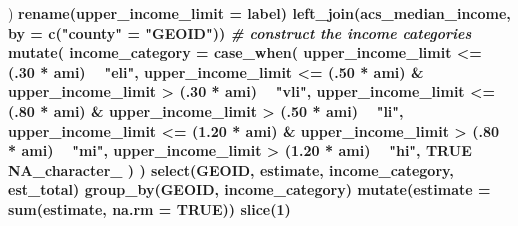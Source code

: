 \documentclass[
]{article}
\newenvironment{Shaded}{\begin{snugshade}}{\end{snugshade}}
\newcommand{\CommentTok}[1]{\textcolor[rgb]{0.56,0.35,0.01}{\textit{#1}}}
\newcommand{\DataTypeTok}[1]{\textcolor[rgb]{0.13,0.29,0.53}{#1}}
\newcommand{\DecValTok}[1]{\textcolor[rgb]{0.00,0.00,0.81}{#1}}
\newcommand{\FloatTok}[1]{\textcolor[rgb]{0.00,0.00,0.81}{#1}}
\newcommand{\KeywordTok}[1]{\textcolor[rgb]{0.13,0.29,0.53}{\textbf{#1}}}
\newcommand{\NormalTok}[1]{#1}
\newcommand{\OperatorTok}[1]{\textcolor[rgb]{0.81,0.36,0.00}{\textbf{#1}}}
\newcommand{\OtherTok}[1]{\textcolor[rgb]{0.56,0.35,0.01}{#1}}
\newcommand{\StringTok}[1]{\textcolor[rgb]{0.31,0.60,0.02}{#1}}
\begin{document}
\begin{Shaded}
\begin{Highlighting}[]
{{{{{{{{{{{{{{{{{{{{{{{{{{\NormalTok{  ) }\OperatorTok{%>%}
\StringTok{  }\KeywordTok{rename}\NormalTok{(}\DataTypeTok{upper_income_limit =}\NormalTok{ label) }\OperatorTok{%>%}
\StringTok{  }\KeywordTok{left_join}\NormalTok{(acs_median_income, }\DataTypeTok{by =} \KeywordTok{c}\NormalTok{(}\StringTok{"county"}\NormalTok{ =}\StringTok{ "GEOID"}\NormalTok{)) }\OperatorTok{%>%}
\StringTok{  }\CommentTok{# construct the income categories}
\StringTok{  }\KeywordTok{mutate}\NormalTok{(}
    \DataTypeTok{income_category =}
      \KeywordTok{case_when}\NormalTok{(}
\NormalTok{        upper_income_limit }\OperatorTok{<=}\StringTok{ }\NormalTok{(.}\DecValTok{30} \OperatorTok{*}\StringTok{ }\NormalTok{ami)       }\OperatorTok{~}\StringTok{ "eli"}\NormalTok{,}
\NormalTok{        upper_income_limit }\OperatorTok{<=}\StringTok{ }\NormalTok{(.}\DecValTok{50} \OperatorTok{*}\StringTok{ }\NormalTok{ami) }\OperatorTok{&}
\StringTok{          }\NormalTok{upper_income_limit }\OperatorTok{>}\StringTok{ }\NormalTok{(.}\DecValTok{30} \OperatorTok{*}\StringTok{ }\NormalTok{ami)      }\OperatorTok{~}\StringTok{ "vli"}\NormalTok{,}
\NormalTok{        upper_income_limit }\OperatorTok{<=}\StringTok{ }\NormalTok{(.}\DecValTok{80} \OperatorTok{*}\StringTok{ }\NormalTok{ami) }\OperatorTok{&}
\StringTok{          }\NormalTok{upper_income_limit }\OperatorTok{>}\StringTok{ }\NormalTok{(.}\DecValTok{50} \OperatorTok{*}\StringTok{ }\NormalTok{ami)      }\OperatorTok{~}\StringTok{ "li"}\NormalTok{,}
\NormalTok{        upper_income_limit }\OperatorTok{<=}\StringTok{ }\NormalTok{(}\FloatTok{1.20} \OperatorTok{*}\StringTok{ }\NormalTok{ami) }\OperatorTok{&}
\StringTok{          }\NormalTok{upper_income_limit }\OperatorTok{>}\StringTok{ }\NormalTok{(.}\DecValTok{80} \OperatorTok{*}\StringTok{ }\NormalTok{ami)      }\OperatorTok{~}\StringTok{ "mi"}\NormalTok{,}
\NormalTok{        upper_income_limit }\OperatorTok{>}\StringTok{ }\NormalTok{(}\FloatTok{1.20} \OperatorTok{*}\StringTok{ }\NormalTok{ami)       }\OperatorTok{~}\StringTok{ "hi"}\NormalTok{,}
        \OtherTok{TRUE}                                    \OperatorTok{~}\StringTok{ }\OtherTok{NA_character_}
\NormalTok{      )}
\NormalTok{  ) }\OperatorTok{%>%}
\StringTok{  }\KeywordTok{select}\NormalTok{(GEOID, estimate, income_category, est_total) }\OperatorTok{%>%}
\StringTok{  }\KeywordTok{group_by}\NormalTok{(GEOID, income_category) }\OperatorTok{%>%}
\StringTok{  }\KeywordTok{mutate}\NormalTok{(}\DataTypeTok{estimate =} \KeywordTok{sum}\NormalTok{(estimate, }\DataTypeTok{na.rm =} \OtherTok{TRUE}\NormalTok{)) }\OperatorTok{%>%}
\StringTok{  }\KeywordTok{slice}\NormalTok{(}\DecValTok{1}\NormalTok{) }\OperatorTok{%>%}
}}}}}}}}}}}}}}}}}}}}}}}}}}}}}}}}}}
\end{Highlighting}
\end{Shaded}
\end{document}

